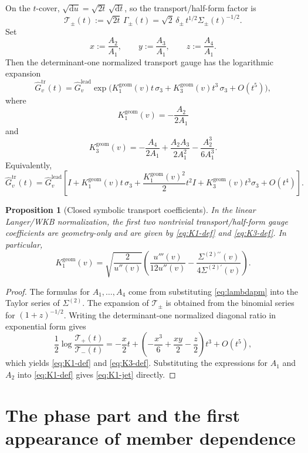 \documentclass[11pt]{article}
\newtheorem{proposition}{Proposition}
\newcommand{\dd}{\mathrm d}
\newcommand{\leadG}{\widehat G_v^{\mathrm{lead}}}
\newcommand{\trG}{\widehat G_v^{\mathrm{tr}}}
\newcommand{\Kone}{K_1^{\mathrm{geom}}(v)}
\newcommand{\Kthree}{K_3^{\mathrm{geom}}(v)}
\begin{document}
On the $t$-cover, $\sqrt{\dd u}=\sqrt{2t}\,\sqrt{\dd t}$, so the transport/half-form factor is
\[
 \mathcal T_\pm(t):=\sqrt{2t}\,\Gamma_\pm(t)=\sqrt{2}\,\delta_\pm\,t^{1/2}\Sigma_\pm(t)^{-1/2}.
\]
Set
\[
 x:=\frac{A_2}{A_1},\qquad y:=\frac{A_3}{A_1},\qquad z:=\frac{A_4}{A_1}.
\]
Then the determinant-one normalized transport gauge has the logarithmic expansion
\begin{equation}
\label{eq:transport-log-expansion}
 \trG(t)=\leadG\exp\!\bigl(\Kone t\,\sigma_3+\Kthree t^3\,\sigma_3+O(t^5)\bigr),
\end{equation}
where
\begin{equation}
\label{eq:K1-def}
 \boxed{\Kone=-\frac{A_2}{2A_1}}
\end{equation}
and
\begin{equation}
\label{eq:K3-def}
 \boxed{\Kthree=-\frac{A_4}{2A_1}+\frac{A_2A_3}{2A_1^2}-\frac{A_2^3}{6A_1^3}}.
\end{equation}
Equivalently,
\[
 \trG(t)=\leadG\left[I+\Kone t\,\sigma_3+\frac{\Kone^2}{2}t^2I+\Kthree t^3\sigma_3+O(t^4)\right].
\]

\begin{proposition}[Closed symbolic transport coefficients]
\label{prop:K1K3}
In the linear Langer/WKB normalization, the first two nontrivial transport/half-form gauge coefficients are geometry-only and are given by \eqref{eq:K1-def} and \eqref{eq:K3-def}.  In particular,
\begin{equation}
\label{eq:K1-jet}
 \boxed{
 \Kone=
 \sqrt{\frac{2}{u''(v)}}\left(\frac{u'''(v)}{12u''(v)}-\frac{\Sigma^{(2)\prime\prime}(v)}{4\Sigma^{(2)\prime}(v)}\right).
 }
\end{equation}
\end{proposition}

\begin{proof}
The formulas for $A_1,\dots,A_4$ come from substituting \eqref{eq:lambdapm} into the Taylor series of $\Sigma^{(2)}$.  The expansion of $\mathcal T_\pm$ is obtained from the binomial series for $(1+z)^{-1/2}$.  Writing the determinant-one normalized diagonal ratio in exponential form gives
\[
\frac12\log\frac{\mathcal T_+(t)}{\mathcal T_-(t)}=
-\frac{x}{2}t+
\left(-\frac{x^3}{6}+\frac{xy}{2}-\frac{z}{2}\right)t^3+O(t^5),
\]
which yields \eqref{eq:K1-def} and \eqref{eq:K3-def}.  Substituting the expressions for $A_1$ and $A_2$ into \eqref{eq:K1-def} gives \eqref{eq:K1-jet} directly.
\end{proof}

\section{The phase part and the first appearance of member dependence}
\end{document}

